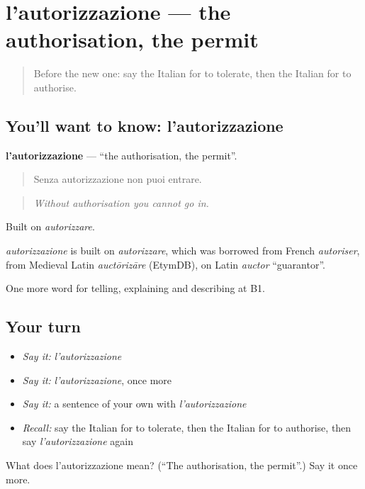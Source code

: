 \section[l'autorizzazione]{l'autorizzazione — the authorisation, the permit}

\label{lesson:IT-C385-autorizzazione}



\begin{quote}
Before the new one: say the Italian for to tolerate, then the Italian for to authorise.
\end{quote}

\subsection*{You'll want to know: l'autorizzazione}
\textbf{l'autorizzazione} — \textquotedblleft{}the authorisation, the permit\textquotedblright{}.

\begin{quote}
Senza autorizzazione non puoi entrare.
\end{quote}

\begin{quote}
\emph{Without authorisation you cannot go in.}
\end{quote}

Built on \emph{autorizzare}.

\begin{cousinweb}
\emph{autorizzazione} is built on \emph{autorizzare}, which was borrowed from French \emph{autoriser}, from Medieval Latin \emph{auctōrizāre} (EtymDB), on Latin \emph{auctor} \textquotedblleft{}guarantor\textquotedblright{}.
\end{cousinweb}

\begin{grammarlens}[title={What you've built}]
One more word for telling, explaining and describing at B1.
\end{grammarlens}

\subsection*{Your turn}
\begin{itemize}
\raggedright
  \item \emph{Say it:} \emph{l'autorizzazione}
  \item \emph{Say it:} \emph{l'autorizzazione}, once more
  \item \emph{Say it:} a sentence of your own with \emph{l'autorizzazione}
  \item \emph{Recall:} say the Italian for to tolerate, then the Italian for to authorise, then say \emph{l'autorizzazione} again
\end{itemize}

\begin{tcolorbox}[breakable,colback=teal!4,colframe=teal!35!black,title={Before you move on}]
What does l'autorizzazione mean? (\textquotedblleft{}The authorisation, the permit\textquotedblright{}.) Say it once more.
\end{tcolorbox}
